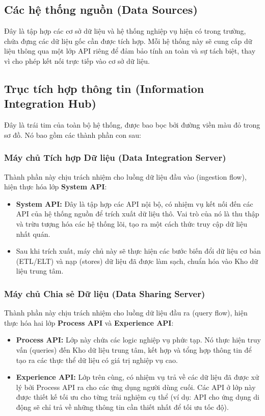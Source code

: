 \subsection{Các hệ thống nguồn (Data Sources)}
Đây là tập hợp các cơ sở dữ liệu và hệ thống nghiệp vụ hiện có trong trường, chứa đựng các dữ liệu gốc cần được tích hợp. Mỗi hệ thống này sẽ cung cấp dữ liệu thông qua một lớp API riêng để đảm bảo tính an toàn và sự tách biệt, thay vì cho phép kết nối trực tiếp vào cơ sở dữ liệu.

\subsection{Trục tích hợp thông tin (Information Integration Hub)}
Đây là trái tim của toàn bộ hệ thống, được bao bọc bởi đường viền màu đỏ trong sơ đồ. Nó bao gồm các thành phần con sau:

\subsubsection{Máy chủ Tích hợp Dữ liệu (Data Integration Server)}
Thành phần này chịu trách nhiệm cho luồng dữ liệu đầu vào (ingestion flow), hiện thực hóa lớp \textbf{System API}:
\begin{itemize}
    \item \textbf{System API:} Đây là tập hợp các API nội bộ, có nhiệm vụ kết nối đến các API của hệ thống nguồn để trích xuất dữ liệu thô. Vai trò của nó là thu thập và trừu tượng hóa các hệ thống lõi, tạo ra một cách thức truy cập dữ liệu nhất quán.
    \item Sau khi trích xuất, máy chủ này sẽ thực hiện các bước biến đổi dữ liệu cơ bản (ETL/ELT) và nạp (stores) dữ liệu đã được làm sạch, chuẩn hóa vào Kho dữ liệu trung tâm.
\end{itemize}

\subsubsection{Máy chủ Chia sẻ Dữ liệu (Data Sharing Server)}
Thành phần này chịu trách nhiệm cho luồng dữ liệu đầu ra (query flow), hiện thực hóa hai lớp \textbf{Process API} và \textbf{Experience API}:
\begin{itemize}
    \item \textbf{Process API:} Lớp này chứa các logic nghiệp vụ phức tạp. Nó thực hiện truy vấn (queries) đến Kho dữ liệu trung tâm, kết hợp và tổng hợp thông tin để tạo ra các thực thể dữ liệu có giá trị nghiệp vụ cao.
    \item \textbf{Experience API:} Lớp trên cùng, có nhiệm vụ trả về các dữ liệu đã được xử lý bởi Process API ra cho các ứng dụng người dùng cuối. Các API ở lớp này được thiết kế tối ưu cho từng trải nghiệm cụ thể (ví dụ: API cho ứng dụng di động sẽ chỉ trả về những thông tin cần thiết nhất để tối ưu tốc độ).
\end{itemize}

